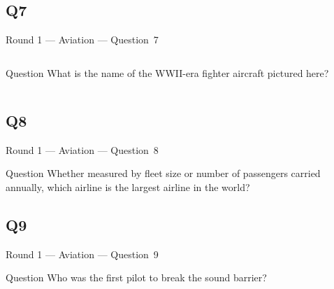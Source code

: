 \documentclass[11pt]{beamer}
\begin{document}
\subsection*{Q7}
\begin{frame}[t]{Round 1 --- Aviation --- \mbox{Question 7}}
    \vspace{-0.5em}
    \begin{columns}[T,totalwidth=\linewidth]
        \begin{column}{0.32\linewidth}
            \begin{block}{Question}
                What is the name of the WWII-era fighter aircraft pictured here?
            \end{block}
        \end{column}
        \begin{column}{0.65\linewidth}
            \begin{center}
                \texttt{[image: \{Images/spitfire]}.jpg}
            \end{center}
        \end{column}
    \end{columns}
\end{frame}
\subsection*{Q8}
\begin{frame}[t]{Round 1 --- Aviation --- \mbox{Question 8}}
    \vspace{-0.5em}
    \begin{block}{Question}
        Whether measured by fleet size or number of passengers carried annually, which airline is the largest airline in the world?
    \end{block}
\end{frame}
\subsection*{Q9}
\begin{frame}[t]{Round 1 --- Aviation --- \mbox{Question 9}}
    \vspace{-0.5em}
    \begin{block}{Question}
        Who was the first pilot to break the sound barrier?
    \end{block}
\end{frame}
\end{document}
